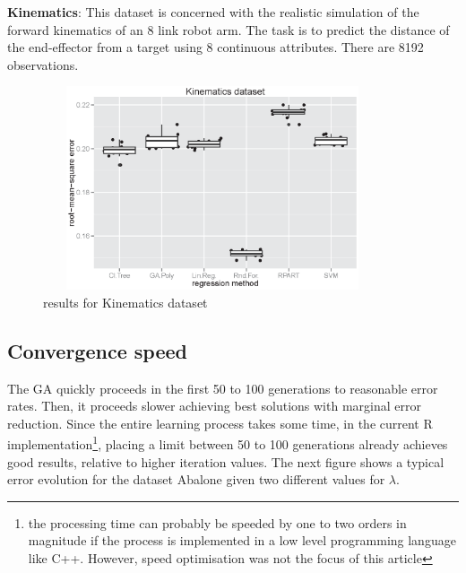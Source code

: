 \documentclass[a4paper, 12pt]{article}
\begin{document}


\textbf{Kinematics}: This dataset is concerned with the realistic simulation of the forward kinematics of an 8 link robot arm. The task is to predict the distance of the end-effector from a target using 8 continuous attributes. There are 8192 observations.

\begin{figure}[htb]
	\begin{center}
		\includegraphics[height=6cm,width=10cm,angle=0]
			{figures/Kinematics_dataset_lambda1.0.eps}
		\caption{results for Kinematics dataset}
	\end{center}
\end{figure}

\subsection{Convergence speed}

The GA quickly proceeds in the first 50 to 100 generations to reasonable error rates. Then, it proceeds slower achieving best solutions with marginal error reduction. Since the entire learning process takes some time, in the current R implementation\footnote{the processing time can probably be speeded by one to two orders in magnitude if the process is implemented in a low level programming language like C++. However, speed optimisation was not the focus of this article}, placing a limit between 50 to 100 generations already achieves good results, relative to higher iteration values. The next figure shows a typical error evolution for the dataset Abalone given two different values for $\lambda$.
\end{document}
